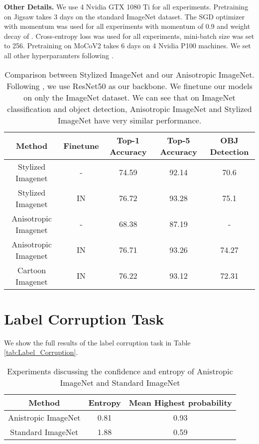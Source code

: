 \documentclass{bmvc2k}
\begin{document}
\noindent\textbf{Other Details.}
We use 4 Nvidia GTX 1080 Ti for all experiments.
Pretraining on Jigsaw takes 3 days on the standard ImageNet dataset. The SGD optimizer with momentum was used for all experiments with momentum of 0.9 and weight decay of . Cross-entropy loss was used for all experiments, mini-batch size was set to 256. Pretraining on MoCoV2 takes 6 days on 4 Nvidia P100 machines. We set all other hyperparamters following \cite{chen2020improved}.

\begin{table*}[t!]
\centering
\caption{Comparison between Stylized ImageNet and our Anisotropic ImageNet. Following \cite{Geirhos2018ImageNettrainedCA}, we use ResNet50 as our backbone. We finetune our models on only the ImageNet dataset. We can see that on ImageNet classification and object detection, Anisotropic ImageNet and Stylized ImageNet have very similar performance.}
\label{tab: Stylized_Classification_experiments}
\begin{tabular}{ccccc}  
\toprule
Method    & Finetune & Top-1 Accuracy & Top-5 Accuracy & OBJ Detection \\
\midrule
Stylized Imagenet     & - & 74.59    & 92.14 &  70.6   \\
Stylized Imagenet    & IN & 76.72    & 93.28 &  75.1  \\
Anisotropic Imagenet   & - & 68.38    & 87.19 & -\\
Anisotropic Imagenet   & IN & 76.71    & 93.26 &   74.27 \\

Cartoon Imagenet   & IN & 76.22    & 93.12 & 72.31   \\
\bottomrule
\end{tabular}
\end{table*}








\section{Label Corruption Task}
We show the full results of the label corruption task in Table \ref{tab:Label_Corruption}.

\begin{table*}
\begin{center}
\caption{Experiments discussing the confidence and entropy of Anistropic ImageNet and Standard ImageNet}
\begin{tabular}{ccc} 
\toprule
Method    & Entropy & Mean Highest probability \\
\midrule
Anistropic ImageNet     & 0.81 & 0.93   \\
Standard ImageNet   & 1.88 & 0.59   \\
\bottomrule
\end{tabular}
\label{tab: Confidence_Experiments}
\end{center}
\end{table*}
\end{document}
